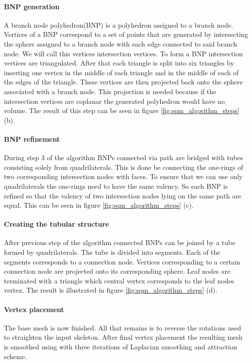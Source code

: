 \paragraph{BNP generation}
A branch node polyhedron(BNP) is a polyhedron assigned to a branch node. Vertices of a BNP correspond to a set of points that are generated by intersecting the sphere assigned to a branch node with each edge connected to said branch node. We will call this vertices intersection vertices. To form a BNP intersection vertices are triangulated. After that each triangle is split into six triangles by inserting one vertex in the middle of each triangle and in the middle of each of the edges of the triangle. These vertices are then projected back onto the sphere associated with a branch node. This projection is needed because if the intersection vertices are coplanar the generated polyhedron would have no volume. The result of this step can be seen in figure \ref{fig:sqm_algorithm_steps} (b).

\paragraph{BNP refinement}
During step 3 of the algorithm BNPs connected via path are bridged with tubes consisting solely from quadrilaterals. This is done be connecting the one-rings of two corresponding intersection nodes with faces. To ensure that we can use only quadrilaterals the one-rings need to have the same valency. So each BNP is refined so that the valency of two intersection nodes lying on the same path are equal. This can be seen in figure \ref{fig:sqm_algorithm_steps} (c).

\paragraph{Creating the tubular structure}
After previous step of the algorithm connected BNPs can be joined by a tube formed by quadrilaterals. The tube is divided into segments. Each of the segments corresponds to a connection node. Vertices corresponding to a certain connection node are projected onto its corresponding sphere. Leaf nodes are terminated with a triangle which central vertex corresponds to the leaf nodes vertex. The result is illustrated in figure \ref{fig:sqm_algorithm_steps} (d).

\paragraph{Vertex placement}
The base mesh is now finished. All that remains is to reverse the rotations used to straighten the input skeleton. After final vertex placement the resulting mesh is smoothed using with three iterations of Laplacian smoothing and attraction scheme.

